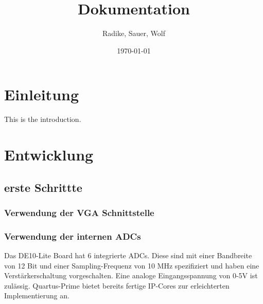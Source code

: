 \documentclass[a4paper,12pt]{article}
\begin{document}
\title{Dokumentation}
\author{Radike, Sauer, Wolf}
\date{\today}
\maketitle
\tableofcontents
\section{Einleitung}
This is the introduction.

\section{Entwicklung}
\subsection{erste Schrittte}
\subsubsection{Verwendung der VGA Schnittstelle}
\subsubsection{Verwendung der internen ADCs}
Das DE10-Lite Board hat 6 integrierte ADCs. Diese sind mit einer Bandbreite von 12 Bit und einer Sampling-Frequenz von 10 MHz spezifiziert und haben eine Verstärkerschaltung vorgeschalten. Eine analoge Eingangsspannung von 0-5V ist zulässig. Quartus-Prime bietet bereits fertige IP-Cores zur erleichterten Implementierung an.
 
\end{document}
